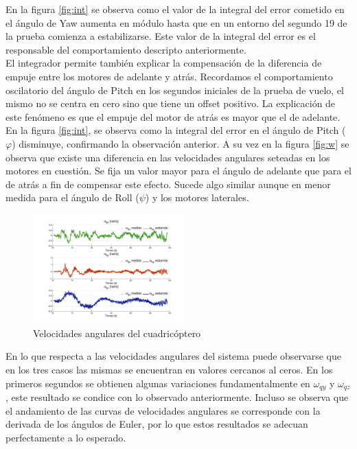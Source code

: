 \documentclass[main]{subfiles}
\begin{document}
En la figura \ref{fig:int} se observa como el valor de la integral del error cometido en el \'angulo de Yaw aumenta en m\'odulo hasta que en un entorno del segundo 19 de la prueba comienza a estabilizarse. Este valor de la integral del error es el responsable del comportamiento descripto anteriormente.\\

El integrador permite tambi\'en explicar la compensaci\'on de la diferencia de empuje entre los motores de adelante y atr\'as. Recordamos el comportamiento oscilatorio del \'angulo de Pitch en los segundos iniciales de la prueba de vuelo, el mismo no se centra en cero sino que tiene un offset positivo. La explicaci\'on de este fen\'omeno es que el empuje del motor de atr\'as es mayor que el de adelante. En la figura \ref{fig:int}, se observa como la integral del error en el \'angulo de Pitch ($\varphi$) disminuye, confirmando la observaci\'on anterior. A su vez en la figura \ref{fig:w} se observa que existe una diferencia en las velocidades angulares seteadas en los motores en cuesti\'on. Se fija un valor mayor para el \'angulo de adelante que para el de atr\'as a fin de compensar este efecto. Sucede algo similar aunque en menor medida para el \'angulo de Roll ($\psi$) y los motores laterales.\\ 

\begin{figure}
	\centering
	\vspace{-10pt}
	\includegraphics[width=0.52\textwidth]{./pics_test_control/wq.pdf}
	\caption{Velocidades angulares del cuadricóptero}
	\label{fig:wq}
\end{figure}
En lo que respecta a las velocidades angulares del sistema puede observarse que en los tres casos las mismas se encuentran en valores cercanos al ceros. En los primeros segundos se obtienen algunas variaciones fundamentalmente en $\omega_{qy}$ y $\omega_{qz}$, este resultado se condice con lo observado anteriormente. Incluso se observa que el andamiento de las curvas de velocidades angulares se corresponde con la derivada de los \'angulos de Euler, por lo que estos resultados se adecuan perfectamente a lo esperado.\\
\end{document}
